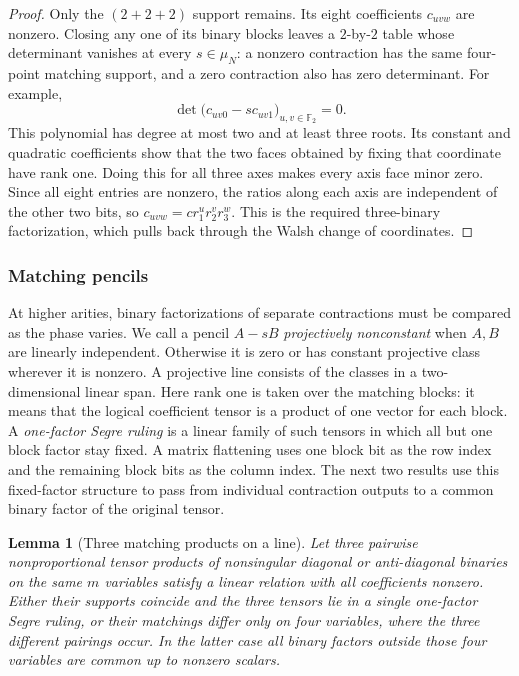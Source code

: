 \documentclass[11pt,letterpaper,onecolumn]{article}
\theoremstyle{plain}
\newtheorem{lemma}[lemma]{Lemma}
\theoremstyle{definition}
\theoremstyle{remark}
\newcommand{\Ftwo}{\mathbb F_2}
\begin{document}
\begin{proof}
		Only the \((2+2+2)\) support remains.  Its eight coefficients
		\(c_{uvw}\) are nonzero.  Closing any one of its binary blocks leaves a
		\(2\)-by-\(2\) table whose determinant vanishes at every \(s\in\mu_N\):
		a nonzero contraction has the same four-point matching support, and a zero contraction
		also has zero determinant.  For example,
		\[
		\det\bigl(c_{uv0}-s c_{uv1}\bigr)_{u,v\in\Ftwo}=0.
		\]
		This polynomial has degree at most two and at least three roots.  Its
		constant and quadratic coefficients show that the two faces obtained by fixing that coordinate have
		rank one.  Doing this for all three axes makes every axis face minor zero.
		Since all eight entries are nonzero, the ratios along each axis are
		independent of the other two bits, so \(c_{uvw}=c r_1^u r_2^v r_3^w\).
		This is the required three-binary factorization, which pulls back through
		the Walsh change of coordinates.
	\end{proof}
	
	\subsubsection{Matching pencils}
	\label{subsec:odd-dih-support-circuits}

	At higher arities, binary factorizations of separate contractions must
	be compared as the phase varies. We call a pencil \(A-sB\) \emph{projectively nonconstant} when
	\(A,B\) are linearly independent.  Otherwise it is zero or has constant
	projective class wherever it is nonzero.
A projective line consists of the classes in a two-dimensional linear span.
Here rank one is taken over the matching blocks: it means that the logical
coefficient tensor is a product of one vector for each block.
A \emph{one-factor Segre ruling} is a linear family of such tensors in which
all but one block factor stay fixed.
A matrix flattening uses one block bit as the row index and the remaining
block bits as the column index.  The next two
results use this fixed-factor structure to pass from individual contraction
outputs to a common binary factor of the original tensor.
	
	\begin{lemma}[Three matching products on a line]
		\label{lem:odd-dih-three-coset-circuit}
		Let three pairwise nonproportional tensor products of nonsingular diagonal
		or anti-diagonal binaries on the same \(m\) variables satisfy a linear relation
		with all coefficients nonzero.  Either their supports coincide and
		the three tensors lie in a single one-factor Segre ruling, or their matchings differ only on four variables, where the three
		different pairings occur.  In the latter case all binary factors outside
		those four variables are common up to nonzero scalars.
	\end{lemma}
	
\end{document}
